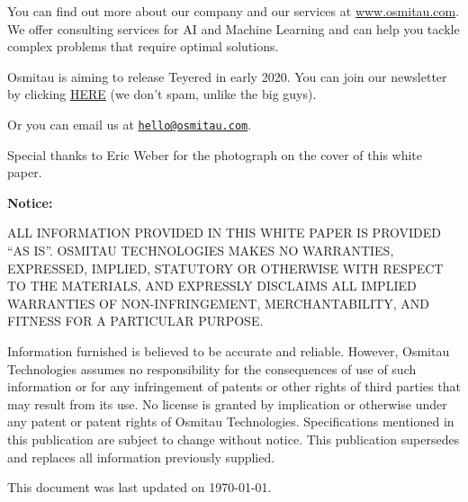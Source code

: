 \documentclass[a4paper, 12pt]{extarticle}
\begin{document}
You can find out more about our company and our services at
\url{www.osmitau.com}. We offer consulting services for AI and Machine
Learning and can help you tackle complex problems that require optimal
solutions.

Osmitau is aiming to release Teyered in early 2020. You can join our newsletter by clicking \href{http://eepurl.com/gO-J9n}{HERE} (we don't spam, unlike the big guys).

Or you can email us at \href{mailto:hello@osmitau.com}{\nolinkurl{hello@osmitau.com}}.




\newpage

Special thanks to Eric Weber for the photograph on the cover of this
white paper.

\vspace*{\fill}
\textbf{Notice:}  

ALL INFORMATION PROVIDED IN THIS WHITE PAPER IS PROVIDED ``AS
IS''. OSMITAU TECHNOLOGIES MAKES NO WARRANTIES, EXPRESSED, IMPLIED,
STATUTORY OR OTHERWISE WITH RESPECT TO THE MATERIALS, AND EXPRESSLY
DISCLAIMS ALL IMPLIED WARRANTIES OF NON-INFRINGEMENT, MERCHANTABILITY,
AND FITNESS FOR A PARTICULAR PURPOSE.


Information furnished is believed to be accurate and reliable. However,
Osmitau Technologies assumes no responsibility for the consequences of
use of such information or for any infringement of patents or other
rights of third parties that may result from its use. No license is
granted by implication or otherwise under any patent or patent rights of
Osmitau Technologies. Specifications mentioned in this publication are
subject to change without notice. This publication supersedes and
replaces all information previously supplied.

This document was last updated on \today.

\newpage
\end{document}
